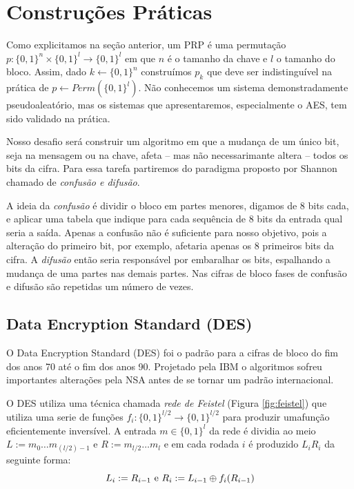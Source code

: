 \section{Construções Práticas}
\label{sec:construcoes-praticas}
Como explicitamos na seção anterior, um PRP é uma permutação $p: \{0,1\}^n \times \{0,1\}^l \to \{0,1\}^l$ em que $n$ é o tamanho da chave e $l$ o tamanho do bloco.
Assim, dado $k \leftarrow \{0,1\}^n$ construímos $p_k$ que deve ser indistinguível na prática de $p \leftarrow Perm(\{0,1\}^l)$.
Não conhecemos um sistema demonstradamente pseudoaleatório, mas os sistemas que apresentaremos, especialmente o AES, tem sido validado na prática.

Nosso desafio será construir um algoritmo em que a mudança de um único bit, seja na mensagem ou na chave, afeta -- mas não necessarimante altera -- todos os bits da cifra.
Para essa tarefa partiremos do paradigma proposto por Shannon chamado de {\em confusão e difusão}.

A ideia da {\em confusão} é dividir o bloco em partes menores, digamos de 8 bits cada, e aplicar uma tabela que indique para cada sequência de 8 bits da entrada qual seria a saída.
Apenas a confusão não é suficiente para nosso objetivo, pois a alteração do primeiro bit, por exemplo, afetaria apenas os 8 primeiros bits da cifra.
A {\em difusão} então seria responsável por embaralhar os bits, espalhando a mudança de uma partes nas demais partes.
Nas cifras de bloco fases de confusão e difusão são repetidas um número de vezes.

\subsection{Data Encryption Standard (DES)}
\label{sec:des}

O Data Encryption Standard (DES) foi o padrão para a cifras de bloco do fim dos anos 70 até o fim dos anos 90.
Projetado pela IBM o algoritmos sofreu importantes alterações pela NSA antes de se tornar um padrão internacional.

O DES utiliza uma técnica chamada {\em rede de Feistel} (Figura \ref{fig:feistel}) que utiliza uma serie de funções $f_i:\{0,1\}^{l/2} \to \{0,1\}^{l/2}$ para produzir umafunção eficientemente inversível.
A entrada $m \in \{0,1\}^l$ da rede é dividia ao meio $L := m_0 \dots m_{(l/2)-1}$ e $R := m_{l/2} \dots m_l$ e em cada rodada $i$ é produzido $L_iR_i$ da seguinte forma:
\begin{displaymath}
  L_i := R_{i-1} \textrm{ e } R_i := L_{i-1} \oplus f_i(R_{i-1})
\end{displaymath}


